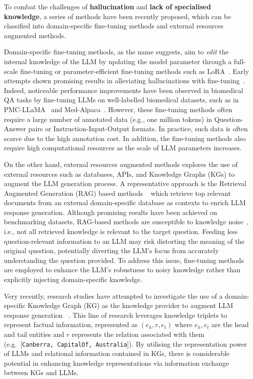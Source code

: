 To combat the challenges of \textbf{hallucination} and \textbf{lack of specialised knowledge}, a series of methods have been recently proposed, which can be classified into domain-specific fine-tuning methods and external resources augmented methods.

Domain-specific fine-tuning methods, as the name suggests, aim to \emph{edit} the internal knowledge of the LLM by updating the model parameter through a full-scale fine-tuning or parameter-efficient fine-tuning methods such as LoRA~\parencite{lora}.
Early attempts shown promising results in alleviating hallucinations with fine-tuning~\parencite{wei2021finetuned}. Indeed, noticeable performance improvements have been observed in biomedical QA tasks by fine-tuning LLMs on well-labelled biomedical datasets, such as in PMC-LLaMA~\parencite{pmc-llama} and Med-Alpaca~\parencite{medalpaca}.
However, these fine-tuning methods often require a large number of annotated data (e.g., one million tokens) in Question-Answer pairs or Instruction-Input-Output formats. In practice, such data is often scarce due to the high annotation cost. 
In addition, the fine-tuning methods also require high computational resources as the scale of LLM parameters increases.

On the other hand, external resources augmented methods explores the use of external resources such as databases, APIs, and Knowledge Graphs (KGs) to augment the LLM generation process. 
A representative approach is the Retrieval Augmented Generation (RAG) based methods ~\parencite{rag, paperqa, rqrag} which retrieve top relevant documents from an external domain-specific database as contexts to enrich LLM response generation. Although promising results have been achieved on benchmarking datasets, RAG-based methods are susceptible to knowledge noise~\parencite{kbert}, i.e., not all retrieved knowledge is relevant to the target question. Feeding less question-relevant information to an LLM may risk distorting the meaning of the original question, potentially diverting the LLM's focus from accurately understanding the question provided. To address this issue, fine-tuning methods are employed to enhance the LLM's robustness to noisy knowledge
rather than explicitly injecting domain-specific knowledge. 

Very recently, research studies have attempted to investigate the use of a domain-specific Knowledge Graph (KG) as the knowledge
provider to augment LLM response generation ~\parencite{gnp, graph-prompter, kalm-prompting}.
This line of research leverages knowledge triplets to represent factual information, represented as $(e_h, r, e_t)$ where $e_h, e_t$ are the head and tail entities and $r$ represents the relation associated with them (e.g.\ [\texttt{Canberra, CapitalOf, Australia}]).
By utilising the representation power of LLMs and relational information contained in KGs, there is considerable potential in enhancing knowledge representations via information exchange between KGs and LLMs.

